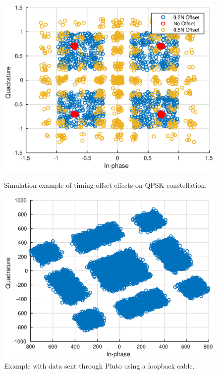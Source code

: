 \documentclass[letterpaper,12pt]{article}
\begin{document}
\begin{figure}
\centering
  \begin{minipage}[b]{0.4\textwidth}
 \includegraphics[width=\textwidth]{refConstellation.eps}
    \caption{Simulation example of timing offset effects on QPSK constellation.}
    \label{fig:1}
  \end{minipage}
  \begin{minipage}[b]{0.4\textwidth}
 \includegraphics[width=\textwidth]{plutoConstellation.eps}
    \caption{Example with data sent through Pluto using a loopback cable.}
    \label{fig:2}
  \end{minipage}
\end{figure}
\end{document}
